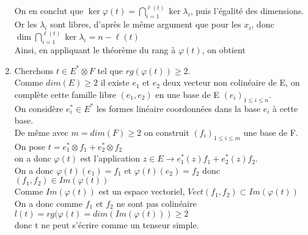 \documentclass{article}
\DeclareMathOperator{\rg}{\mathrm{rg}}
\def \r {{\ell(t)}}
\begin{document}
\begin{enumerate}[1., start=1]
        \par \setlength{\leftskip}{0cm}
        On en conclut que $\displaystyle\ker \varphi(t) = \bigcap_{i=1}^\r\ker\lambda_i$, puis l'égalité des dimensions.\\
        Or les $\lambda_i$ sont libres, d'après le même argument que pour les $x_i$, donc $\displaystyle \dim\bigcap_{i=1}^\r\ker\lambda_i = n-\r$\\
        Ainsi, en appliquant le théorème du rang à $\varphi(t)$, on obtient
        \boxed{\rg\varphi(t) = \r}
    \item
    Cherchons $t\in E^* \otimes F$ tel que $rg(\varphi(t))\geq 2$. \\
    Comme $dim(E)\geq 2$ il existe $e_1$ et $e_2$ deux vecteur non colinéaire de E, on complète cette famille libre $(e_1,e_2)$ en une base de E $(e_i)_{1\leq i \leq n}$.  \\
    On considère $e^*_i \in E^*$ les formes linéaire coordonnées dans la base $e_i$ à cette base. \\
    De même avec $m=dim(F) \geq 2$ on construit $(f_i)_{1\leq i \leq m}$ une base de F. \\
    On pose $t=e^*_1 \otimes f_1 + e^*_2 \otimes f_2$ \\
    on a donc $\varphi(t)$ est l'application $z \in E \rightarrow e^*_1(z) f_1 + e^*_2(z) f_2$. \\
    On a donc $\varphi(t)(e_1)=f_1$ et $\varphi(t)(e_2)=f_2$ donc $(f_1,f_2) \in Im(\varphi(t))$ \\
    Comme $Im(\varphi(t))$ est un espace vectoriel, $Vect(f_1,f_2) \subset Im(\varphi(t))$ \\
    On a donc comme $f_1$ et $f_2$ ne sont pas colinéaire $l(t)=rg(\varphi(t)=dim(Im(\varphi(t))) \geq 2$ \\
    donc t ne peut s'écrire comme un tenseur simple.

\end{enumerate}
\end{document}
